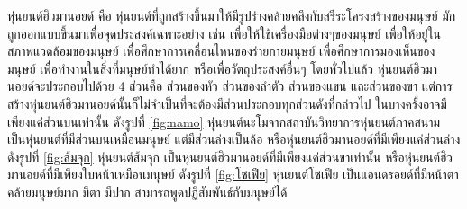 หุ่นยนต์ฮิวมานอยด์ คือ หุ่นยนต์ที่ถูกสร้างขึ้นมาให้มีรูปร่างคล้ายคลึงกับสรีระโครงสร้างของมนุษย์
มักถูกออกแบบขึ้นมาเพื่อจุดประสงค์เฉพาะอย่าง เช่น เพื่อให้ใช้เครื่องมือต่างๆของมนุษย์ เพื่อให้อยู่ในสภาพแวดล้อมของมนุษย์
เพื่อศึกษาการเคลื่อนไหนของร่ายกายมนุษย์ เพื่อศึกษาการมองเห็นของมนุษย์ เพื่อทำงานในสิ่งที่มนุษย์ทำได้ยาก
หรือเพื่อวัตถุประสงค์อื่นๆ โดยทั่วไปแล้ว หุ่นยนต์ฮิวมานอยด์จะประกอบไปด้วย 4 ส่วนคือ ส่วนของหัว ส่วนของลำตัว ส่วนของแขน
และส่วนของขา แต่การสร้างหุ่นยนต์ฮิวมานอยด์นั้นก็ไม่จำเป็นที่จะต้องมีส่วนประกอบทุกส่วนดังที่กล่าวไป
ในบางครั้งอาจมีเพียงแค่ส่วนบนเท่านั้น ดังรูปที่ \ref{fig:namo} หุ่นยนต์นะโมจากสถาบันวิทยาการหุ่นยนต์ภาคสนาม
เป็นหุ่นยนต์ที่มีส่วนบนเหมือนมนุษย์ แต่มีส่วนล่างเป็นล้อ หรือหุ่นยนต์ฮิวมานอยด์ที่มีเพียงแค่ส่วนล่าง ดังรูปที่ \ref{fig:ส้มจุก}
หุ่นยนต์ส้มจุก เป็นหุ่นยนต์ฮิวมานอยด์ที่มีเพียงแค่ส่วนขาเท่านั้น หรือหุ่นยนต์ฮิวมานอยด์ที่มีเพียงใบหน้าเหมือนมนุษย์ ดังรูปที่
\ref{fig:โซเฟีย} หุ่นยนต์โซเฟีย เป็นแอนดรอยด์ที่มีหน้าตาคล้ายมนุษย์มาก มีตา มีปาก สามารถพูดปฏิสัมพันธ์กับมนุษย์ได้

